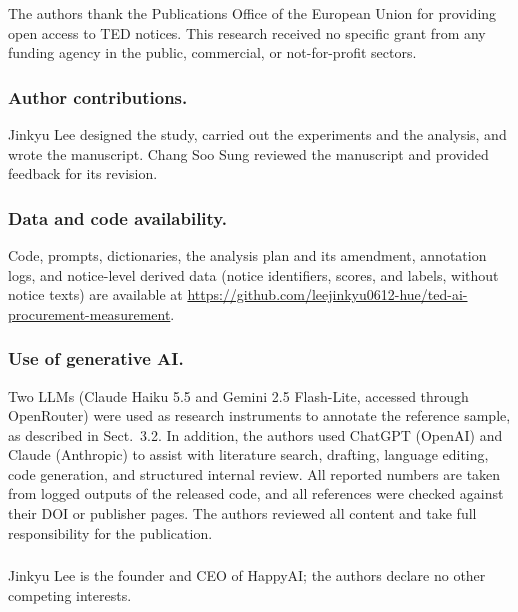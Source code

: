 \begin{credits}
\subsubsection{\ackname} The authors thank the Publications Office of the European Union for providing open access to TED notices. This research received no specific grant from any funding agency in the public, commercial, or not-for-profit sectors.

\subsubsection{Author contributions.} Jinkyu Lee designed the study, carried out the experiments and the analysis, and wrote the manuscript. Chang Soo Sung reviewed the manuscript and provided feedback for its revision.

\subsubsection{Data and code availability.} Code, prompts, dictionaries, the analysis plan and its amendment, annotation logs, and notice-level derived data (notice identifiers, scores, and labels, without notice texts) are available at \url{https://github.com/leejinkyu0612-hue/ted-ai-procurement-measurement}.

\subsubsection{Use of generative AI.} Two LLMs (Claude Haiku 5.5 and Gemini 2.5 Flash-Lite, accessed through OpenRouter) were used as research instruments to annotate the reference sample, as described in Sect.~3.2. In addition, the authors used ChatGPT (OpenAI) and Claude (Anthropic) to assist with literature search, drafting, language editing, code generation, and structured internal review. All reported numbers are taken from logged outputs of the released code, and all references were checked against their DOI or publisher pages. The authors reviewed all content and take full responsibility for the publication.

\subsubsection{\discintname} Jinkyu Lee is the founder and CEO of HappyAI; the authors declare no other competing interests.
\end{credits}
